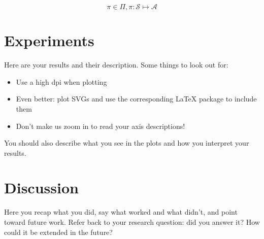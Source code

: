 \documentclass{article}
\begin{document}
\begin{equation}
    \label{eq:pi}
    \pi \in \Pi, \pi: \mathcal{S} \mapsto \mathcal{A}
\end{equation}

\section{Experiments}
Here are your results and their description. Some things to look out for:
\begin{itemize}
    \item Use a high dpi when plotting
    \item Even better: plot SVGs and use the corresponding LaTeX package to include them
    \item Don't make us zoom in to read your axis descriptions!
\end{itemize}
You should also describe what you see in the plots and how you interpret your results.

\section{Discussion}
Here you recap what you did, say what worked and what didn't, and point toward future work.
Refer back to your research question: did you answer it? How could it be extended in the future?

\newpage



\newpage
\end{document}
